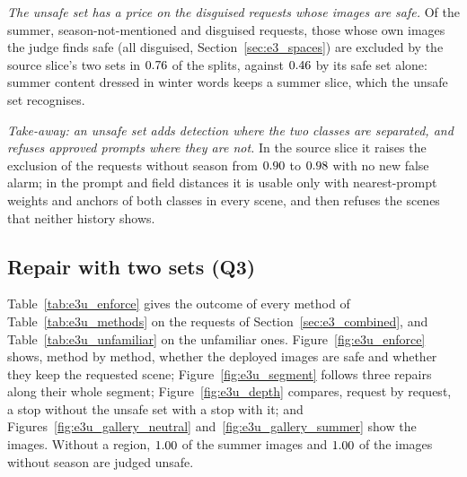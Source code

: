 \documentclass{article}
\theoremstyle{plain}
\theoremstyle{remark}
\begin{document}
\emph{The unsafe set has a price on the disguised requests whose images are safe.} Of the summer, season-not-mentioned and disguised
requests, those whose own images the judge finds safe (all disguised, Section~\ref{sec:e3_spaces}) are excluded by the source slice's two
sets in $0.76$ of the splits, against $0.46$ by its safe set alone: summer content dressed in winter words keeps a summer
slice, which the unsafe set recognises.

\emph{Take-away: an unsafe set adds detection where the two classes are separated, and refuses approved prompts where they are not.} In the
source slice it raises the exclusion of the requests without season from $0.90$ to $0.98$ with no new false alarm; in
the prompt and field distances it is usable only with nearest-prompt weights and anchors of both classes in every scene, and then refuses
the scenes that neither history shows.
\FloatBarrier

\subsection{Repair with two sets (Q3)}\label{sec:e3u_repair}

Table~\ref{tab:e3u_enforce} gives the outcome of every method of Table~\ref{tab:e3u_methods} on the requests of
Section~\ref{sec:e3_combined}, and Table~\ref{tab:e3u_unfamiliar} on the unfamiliar ones. Figure~\ref{fig:e3u_enforce} shows, method by
method, whether the deployed images are safe and whether they keep the requested scene; Figure~\ref{fig:e3u_segment} follows three repairs
along their whole segment; Figure~\ref{fig:e3u_depth} compares, request by request, a stop without the unsafe set with a stop with it; and
Figures~\ref{fig:e3u_gallery_neutral} and~\ref{fig:e3u_gallery_summer} show the images. Without a region, $1.00$ of the
summer images and $1.00$ of the images without season are judged unsafe.
\end{document}
